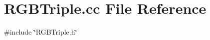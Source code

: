 \section{R\+G\+B\+Triple.\+cc File Reference}
\label{RGBTriple_8cc}
{\ttfamily \#include \char`\"{}R\+G\+B\+Triple.\+h\char`\"{}}\newline
